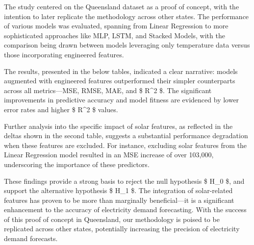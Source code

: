 \documentclass[mstat,12pt]{unswthesis}
\begin{document}
The study centered on the Queensland dataset as a proof of concept, with
the intention to later replicate the methodology across other states.
The performance of various models was evaluated, spanning from Linear
Regression to more sophisticated approaches like MLP, LSTM, and Stacked
Models, with the comparison being drawn between models leveraging only
temperature data versus those incorporating engineered features.

The results, presented in the below tables, indicated a clear narrative:
models augmented with engineered features outperformed their simpler
counterparts across all metrics---MSE, RMSE, MAE, and \$ R\^{}2 \$. The
significant improvements in predictive accuracy and model fitness are
evidenced by lower error rates and higher \$ R\^{}2 \$ values.

Further analysis into the specific impact of solar features, as
reflected in the deltas shown in the second table, suggests a
substantial performance degradation when these features are excluded.
For instance, excluding solar features from the Linear Regression model
resulted in an MSE increase of over 103,000, underscoring the importance
of these predictors.

These findings provide a strong basis to reject the null hypothesis \$
H\_0 \$, and support the alternative hypothesis \$ H\_1 \$. The
integration of solar-related features has proven to be more than
marginally beneficial---it is a significant enhancement to the accuracy
of electricity demand forecasting. With the success of this proof of
concept in Queensland, our methodology is poised to be replicated across
other states, potentially increasing the precision of electricity demand
forecasts.
\end{document}
